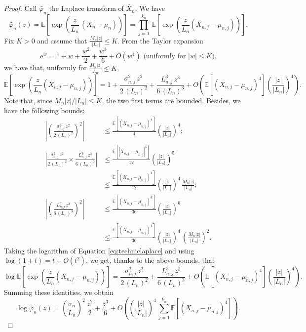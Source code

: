 \documentclass[12pt,a4paper,reqno]{amsart}
\theoremstyle{remark}
\newcommand{\E}{\mathrm{e}}
\newcommand{\esper}{\mathbb{E}}
\begin{document}
\begin{proof}
Call $\widetilde{\varphi_n}$ the Laplace transform of $\widetilde{X_n}$. We have
\[ \widetilde{\varphi_n}(z) = \esper\!\left[ \exp\left(\frac{z}{L_n}\, (X_n-\mu_n)\right) \right] = \prod_{j=1}^{k_n} \,\esper\!\left[ \exp \left(\frac{z}{L_n} (X_{n,j}-\mu_{n,j}) \right) \right]. \]
Fix $K>0$ and assume that $\frac{M_n |z| }{|L_n|} \le K$. From the Taylor expansion 
\[\E^w=1+w+\frac{w^2}{2}+\frac{w^3}{6} +O(w^4) \text{ (uniformly for $|w| \le K$),}\] 
we have that, uniformly for $\frac{M_n |z| }{|L_n|} \le K$,
 \begin{equation}
    \esper\!\left[\exp \left(\frac{z}{L_n} (X_{n,j}-\mu_{n,j}) \right) \right] = 1+\frac{\sigma_{n,j}^2\,z^2}{2\,(L_n)^2} + \frac{L_{n,j}^3\,z^3}{6\,(L_n)^3} +  O\!\left(\esper[(X_{n,j}-\mu_{n,j})^4] \left(\frac{|z|}{|L_n|}\right)^{\!4} \right).
    \label{eq:techniclaplace}
\end{equation}
Note that, since $M_n |z| /|L_n| \le K$, the two first terms are bounded. Besides, we have the following bounds:
    \begin{align*}
        \left| \left(\frac{\sigma_{n,j}^2\,z^2}{2\,(L_n)^2} \right)^2 \right| &\le \frac{\esper[(X_{n,j}-\mu_{n,j})^4]}{4} \left(\frac{|z|}{|L_n|}\right)^{\!4} ;\\
        \left| \frac{\sigma_{n,j}^2\,z^2}{2\,(L_n)^2}  \times \frac{L_{n,j}^3\,z^3}{6\,(L_n)^3} \right| & \le \frac{\esper[|X_{n,j}-\mu_{n,j}|^5]}{12} \left(\frac{|z|}{|L_n|}\right)^{\!5} \\
        &\le \frac{\esper[(X_{n,j}-\mu_{n,j})^4]}{12} \left(\frac{|z|}{|L_n|}\right)^{\!4}\, \frac{M_n |z|}{|L_n|};\\
        \left| \left(\frac{L_{n,j}^3\,z^3}{6\,(L_n)^3}\right)^2 \right| &\le \frac{\esper[(X_{n,j}-\mu_{n,j})^6]}{36} \left(\frac{|z|}{|L_n|}\right)^{\!6}\\
        & \le \frac{\esper[(X_{n,j}-\mu_{n,j})^4]}{36} \left(\frac{|z|}{|L_n|}\right)^{\!4} \,\left( \frac{M_n |z|}{|L_n|} \right)^2.
    \end{align*}
Taking the logarithm of Equation \eqref{eq:techniclaplace} and using $\log(1+t)=t+O(t^2)$, we get, thanks to the above bounds, that
$$\log \esper\!\left[ \exp \left(\frac{z}{L_n} (X_{n,j}-\mu_{n,j}) \right) \right] = \frac{\sigma_{n,j}^2\,z^2}{2\,(L_n)^2} + \frac{L_{n,j}^3\,z^3}{6\,(L_n)^3} +  O\!\left(\esper[(X_{n,j}-\mu_{n,j})^4] \left(\frac{|z|}{|L_n|}\right)^{\!4} \right).$$
Summing these identities, we obtain
\[\log \widetilde{\varphi_n}(z) = \left(\frac{\sigma_n}{L_n}\right)^2\,\frac{z^2}{2}+ \frac{z^3}{6} + O\!\left(\left(\frac{|z|}{|L_n|}\right)^{\!4} \,\sum_{j=1}^{k_n}\esper[(X_{n,j}-\mu_{n,j})^4] \right).\]

\end{proof}
\end{document}
